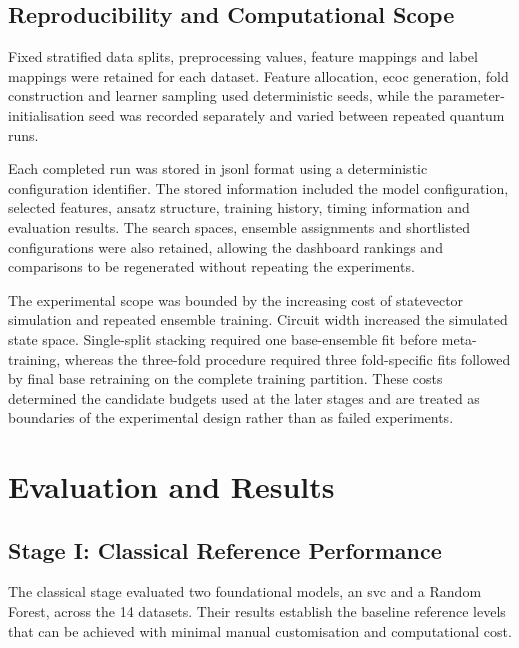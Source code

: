 \documentclass[]{UCD_CS_MSc_AAI_Report}
\begin{document}
\section{Reproducibility and Computational Scope}
\label{sec:method-reproducibility-scope}

Fixed stratified data splits, preprocessing values, feature mappings and label mappings were retained for each dataset. Feature allocation, \ac{ecoc} generation, fold construction and learner sampling used deterministic seeds, while the parameter-initialisation seed was recorded separately and varied between repeated quantum runs.

Each completed run was stored in \ac{jsonl} format using a deterministic configuration identifier. The stored information included the model configuration, selected features, ansatz structure, training history, timing information and evaluation results. The search spaces, ensemble assignments and shortlisted configurations were also retained, allowing the dashboard rankings and comparisons to be regenerated without repeating the experiments.

The experimental scope was bounded by the increasing cost of statevector simulation and repeated ensemble training. Circuit width increased the simulated state space. Single-split stacking required one base-ensemble fit before meta-training, whereas the three-fold procedure required three fold-specific fits followed by final base retraining on the complete training partition. These costs determined the candidate budgets used at the later stages and are treated as boundaries of the experimental design rather than as failed experiments.


\chapter{Evaluation and Results}
\label{chap:results}

\section{Stage I: Classical Reference Performance}
\label{sec:results-classical}

The classical stage evaluated two foundational models, an \ac{svc} and a Random Forest, across the 14 datasets. Their results establish the baseline reference levels that can be achieved with minimal manual customisation and computational cost.
\end{document}
